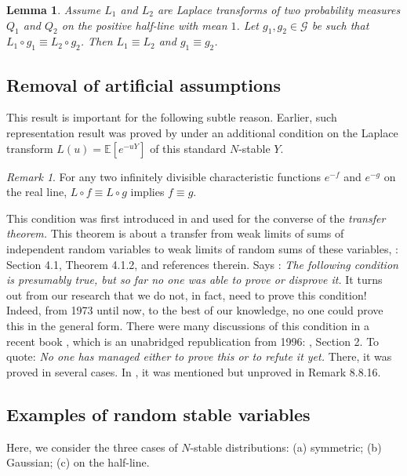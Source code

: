 \documentclass[12pt]{amsart}
\newtheorem{lemma}{Lemma}[section]
\theoremstyle{remark}
\newtheorem{remark}{Remark}[section]
\theoremstyle{definition}
\begin{document}
\begin{lemma} Assume $L_1$ and $L_2$ are Laplace transforms of two probability measures $Q_1$ and $Q_2$ on the positive half-line with mean $1$. Let $g_1, g_2 \in \mathcal G$ be such that $L_1\circ g_1 \equiv L_2 \circ g_2$. Then $L_1 \equiv L_2$ and $g_1 \equiv g_2$.
\label{lemma:unique}
\end{lemma}

\subsection{Removal of artificial assumptions} This result is important for the following subtle reason. Earlier, such representation result was proved by \cite{Anna} under an additional condition on the Laplace transform $L(u) = \mathbb E[e^{-uY}]$ of this standard $N$-stable $Y$. 

\begin{remark}
\label{rmk:artificial}
For any two infinitely divisible characteristic functions $e^{-f}$ and $e^{-g}$ on the real line, $L\circ f \equiv L\circ g$ implies $f\equiv g$. 
\end{remark}

This condition was first introduced in \cite{Szasz} and used for the converse of the {\it transfer theorem.} This theorem is about a transfer from weak limits of sums of independent random variables to weak limits of random sums of these variables, \cite[Chapter 4]{GnedenkoBook}: Section 4.1, Theorem 4.1.2, and references therein. Says \cite{Szasz}: {\it The following condition is presumably true, but so far no one was able to prove or disprove it.} It turns out from our research that we do not, in fact, need to prove this condition! Indeed, from 1973 until now, to the best of our knowledge, no one could prove this in the general form. There were many discussions of this condition in a recent book \cite{GnedenkoBook}, which is an unabridged republication from 1996: \cite[Chapter 4]{GnedenkoBook}, Section 2. To quote: {\it No one has managed either to prove this or to refute it yet.} There, it was proved in several cases. In \cite[Chapter 8]{KKRbook}, it was mentioned but unproved in Remark 8.8.16. 

\subsection{Examples of random stable variables} Here, we consider the three cases of $N$-stable distributions: (a) symmetric; (b) Gaussian; (c) on the half-line.
\end{document}
